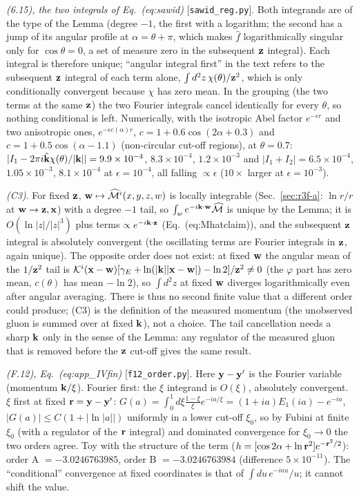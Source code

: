 \noindent\emph{(6.15), the two integrals of Eq.~(eq:sawid)} [\texttt{sawid\_reg.py}]. Both integrands are of the type of the Lemma (degree $-1$, the first with a logarithm; the second has a jump of its angular profile at $\alpha=\theta+\pi$, which makes $\hat f$ logarithmically singular only for $\cos\theta=0$, a set of measure zero in the subsequent $\mathbf{z}$ integral). Each integral is therefore unique; ``angular integral first'' in the text refers to the subsequent $\mathbf{z}$ integral of each term alone, $\int d^2z\,\chi(\theta)/\mathbf{z}^2$, which is only conditionally convergent because $\chi$ has zero mean. In the grouping (the two terms at the same $\mathbf{z}$) the two Fourier integrals cancel identically for every $\theta$, so nothing conditional is left. Numerically, with the isotropic Abel factor $e^{-\epsilon r}$ and two anisotropic ones, $e^{-\epsilon c(\alpha)r}$, $c=1+0.6\cos(2\alpha+0.3)$ and $c=1+0.5\cos(\alpha-1.1)$ (non-circular cut-off regions), at $\theta=0.7$: $|I_1-2\pi i\hat{\mathbf{k}}\chi(\theta)/|\mathbf{k}||=9.9\times10^{-4}$, $8.3\times10^{-4}$, $1.2\times10^{-3}$ and $|I_1+I_2|=6.5\times10^{-4}$, $1.05\times10^{-3}$, $8.1\times10^{-4}$ at $\epsilon=10^{-4}$, all falling $\propto\epsilon$ ($10\times$ larger at $\epsilon=10^{-3}$).

\noindent\emph{(C3)}. For fixed $\mathbf{z}$, $\mathbf{w}\mapsto\widehat{\mathcal M}^i(x,y,z,w)$ is locally integrable (Sec.~\ref{sec:r3f-a}: $\ln r/r$ at $\mathbf{w}\to\mathbf{z},\mathbf{x}$) with a degree $-1$ tail, so $\int_we^{-i\mathbf{k}\cdot\mathbf{w}}\widehat{\mathcal M}$ is unique by the Lemma; it is $O(\ln|z|/|z|^3)$ plus terms $\propto e^{-i\mathbf{k}\cdot\mathbf{z}}$ (Eq.~(eq:Mhatclaim)), and the subsequent $\mathbf{z}$ integral is absolutely convergent (the oscillating terms are Fourier integrals in $\mathbf{z}$, again unique). The opposite order does not exist: at fixed $\mathbf{w}$ the angular mean of the $1/\mathbf{z}^2$ tail is $\mathcal K^i(\mathbf{x}-\mathbf{w})[\gamma_E+\ln(|\mathbf{k}||\mathbf{x}-\mathbf{w}|)-\ln2]/\mathbf{z}^2\neq0$ (the $\varphi$ part has zero mean, $c(\theta)$ has mean $-\ln2$), so $\int d^2z$ at fixed $\mathbf{w}$ diverges logarithmically even after angular averaging. There is thus no second finite value that a different order could produce; (C3) is the definition of the measured momentum (the unobserved gluon is summed over at fixed $\mathbf{k}$), not a choice. The tail cancellation needs a sharp $\mathbf{k}$ only in the sense of the Lemma: any regulator of the measured gluon that is removed before the $\mathbf{z}$ cut-off gives the same result.

\noindent\emph{(F.12), Eq.~(eq:app\_IVfin)} [\texttt{f12\_order.py}]. Here $\mathbf{y}-\mathbf{y}'$ is the Fourier variable (momentum $\mathbf{k}/\xi$). Fourier first: the $\xi$ integrand is $O(\xi)$, absolutely convergent. $\xi$ first at fixed $\mathbf{r}=\mathbf{y}-\mathbf{y}'$: $G(a)=\int_0^1d\xi\frac{1-\xi}{\xi}e^{-ia/\xi}=(1+ia)E_1(ia)-e^{-ia}$, $|G(a)|\le C(1+|\ln|a||)$ uniformly in a lower cut-off $\xi_0$, so by Fubini at finite $\xi_0$ (with a regulator of the $\mathbf{r}$ integral) and dominated convergence for $\xi_0\to0$ the two orders agree. Toy with the structure of the term ($h=[\cos2\alpha+\ln\mathbf{r}^2]e^{-\mathbf{r}^2/2}$): order A $=-3.0246763985$, order B $=-3.0246763984$ (difference $5\times10^{-11}$). The ``conditional'' convergence at fixed coordinates is that of $\int du\,e^{-iau}/u$; it cannot shift the value.


